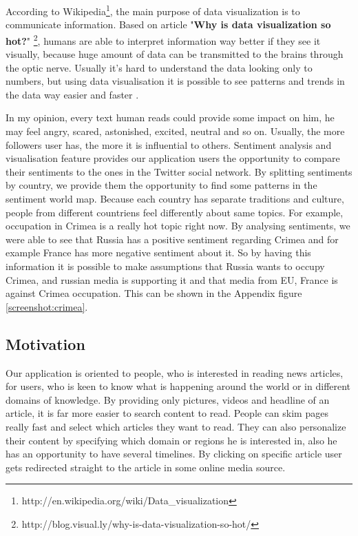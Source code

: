 \documentclass{acm_proc_10ptArticle-sp}
\begin{document}
According to Wikipedia\footnote{http://en.wikipedia.org/wiki/Data\_visualization}, the main purpose of data visualization is to communicate information. Based on article "\textbf{Why is data visualization so hot?}" \footnote{http://blog.visual.ly/why-is-data-visualization-so-hot/}, humans are able to interpret information way better if they see it visually, because huge amount of data can be transmitted to the brains through the optic nerve. Usually it's hard to understand the data looking only to numbers, but using data visualisation it is possible to see patterns and trends in the data way easier and faster \cite{kaidi}.

In my opinion, every text human reads could provide some impact on him, he may feel angry, scared, astonished, excited, neutral and so on. Usually, the more followers user has, the more it is influential to others. Sentiment analysis and visualisation feature provides our application users the opportunity to compare their sentiments to the ones in the Twitter social network. By splitting sentiments by country, we provide them the opportunity to find some patterns in the sentiment world map. Because each country has separate traditions and culture, people from different countriens feel differently about same topics. For example, occupation in Crimea is a really hot topic right now. By analysing sentiments, we were able to see that Russia has a positive sentiment regarding Crimea and for example France has more negative sentiment about it. So by having this information it is possible to make assumptions that Russia wants to occupy Crimea, and russian media is supporting it and that media from EU, France is against Crimea occupation. This can be shown in the Appendix figure \ref{screenshot:crimea}.

\subsection{Motivation}

Our application is oriented to people, who is interested in reading news articles, for users, who is keen to know what is happening around the world or in different domains of knowledge. By providing only pictures, videos and headline of an article, it is far more easier to search content to read. People can skim pages really fast and select which articles they want to read. They can also personalize their content by specifying which domain or regions he is interested in, also he has an opportunity to have several timelines. By clicking on specific article user gets redirected straight to the article in some online media source.
\end{document}
